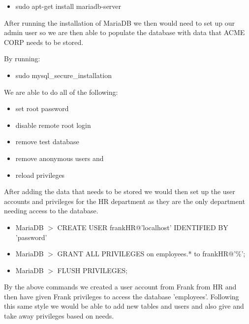 \begin{itemize}

\item sudo apt-get install mariadb-server

\end{itemize}

\noindent After running the installation of MariaDB we then would need to set up our admin user so we are then able to populate the database with data that ACME CORP needs to be stored. 

\noindent By running:

\begin{itemize}
\item sudo mysql\_secure\_installation \\
\end{itemize}

\noindent We are able to do all of the following: 

\begin{itemize}
\item set root password
\item disable remote root login
\item remove test database
\item remove anonymous users and
\item reload privileges
\end{itemize}

\noindent After adding the data that needs to be stored we would then set up the user accounts and privileges for the HR department as they are the only department needing access to the database.

\begin{itemize}

\item MariaDB $>$ CREATE USER frankHR@'localhost' IDENTIFIED BY 'password'

\item MariaDB $>$ GRANT ALL PRIVILEGES on employees.* to frankHR@'\%';

\item MariaDB $>$ FLUSH PRIVILEGES; 

\end{itemize}

\noindent By the above commands we created a user account from Frank from HR and then have given Frank privileges to access the database 'employees'. Following this same style we would be able to add new tables and users and also give and take away privileges based on needs.

